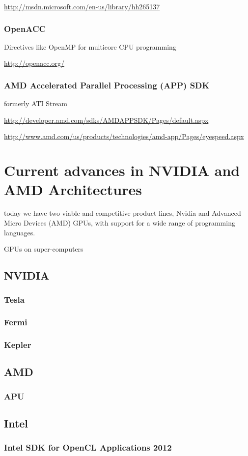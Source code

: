 \hyperref[C++ AMP MSDN]{http://msdn.microsoft.com/en-us/library/hh265137}

\subsubsection{OpenACC}
Directives like OpenMP for multicore CPU programming

\hyperref[OpenACC]{http://openacc.org/}

\subsubsection{AMD Accelerated Parallel Processing (APP) SDK}
formerly ATI Stream

\hyperref[AMD 1]{http://developer.amd.com/sdks/AMDAPPSDK/Pages/default.aspx}

\hyperref[AMD 2]{http://www.amd.com/us/products/technologies/amd-app/Pages/eyespeed.aspx}

\section{Current advances in NVIDIA and AMD Architectures}
today we have two viable and
competitive product lines, Nvidia and Advanced
Micro Devices (AMD) GPUs, with support for a
wide range of programming languages.

GPUs on super-computers

\subsection{NVIDIA}
\subsubsection{Tesla}
\subsubsection{Fermi}
\subsubsection{Kepler}

\subsection{AMD}
\subsubsection{APU}

\subsection{Intel}
\subsubsection{Intel SDK for OpenCL Applications 2012}
